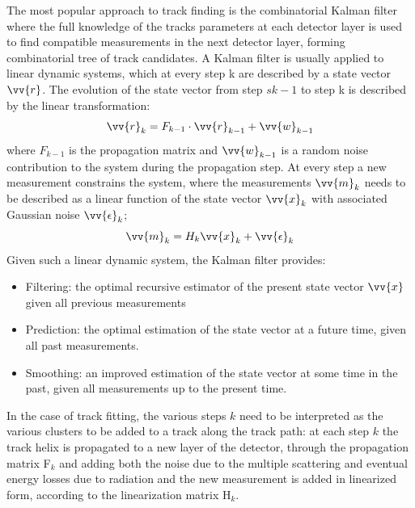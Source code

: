 The most popular approach to track finding is the combinatorial Kalman filter where the full knowledge of the tracks parameters at each detector layer is used to find compatible measurements in the next detector layer, forming combinatorial tree of track candidates.
A Kalman filter is usually applied to linear dynamic systems, which at every step k are described by a state vector $\vv{r}$. The evolution of the state vector from step $sk-1$ to step k is described by the linear transformation:
\begin{equation}
\vv{r}_k = F_{k-1}\cdot \vv{r}_{k-1} + \vv{w}_{k-1}
\end{equation}
where $F_{k-1}$ is the propagation matrix and $\vv{w}_{k-1}$ is a random noise contribution to the system during the propagation step. At every step a new measurement constrains the system, where the measurements $\vv{m}_k$ needs to be described as a linear function of the state vector $\vv{x}_k$ with associated Gaussian noise $\vv{\epsilon}_k$;
\begin{equation}
\vv{m}_k = H_k \vv{x}_k + \vv{\epsilon}_k
\end{equation}
Given such a linear dynamic system, the Kalman filter provides:
\begin{itemize}
\item Filtering: the optimal recursive estimator of the present state vector $\vv{x}$ given all previous measurements
\item Prediction: the optimal estimation of the state vector at a future time, given all past measurements.
\item Smoothing: an improved estimation of the state vector at some time in the past, given all measurements up to the present time.
\end{itemize}
In the case of track fitting, the various steps $k$ need to be interpreted as the various clusters to be added to a track along the track path: at each step $k$ the track helix is propagated to a new layer of the detector, through the propagation matrix F$_k$ and adding both the noise due to the multiple scattering and eventual energy losses due to radiation and the new measurement is added in linearized form, according to the linearization matrix H$_k$.



